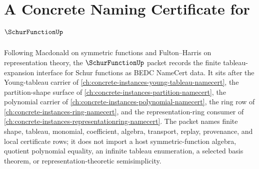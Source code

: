 \chapter{A Concrete Naming Certificate for $\SchurFunctionUp$}
\label{ch:concrete-instances-schur-function-namecert}

Following Macdonald on symmetric functions and Fulton--Harris on representation theory, the $\SchurFunctionUp$ packet records the finite tableau-expansion interface for Schur functions as BEDC NameCert data. It sits after the Young-tableau carrier of \autoref{ch:concrete-instances-young-tableau-namecert}, the partition-shape surface of \autoref{ch:concrete-instances-partition-namecert}, the polynomial carrier of \autoref{ch:concrete-instances-polynomial-namecert}, the ring row of \autoref{ch:concrete-instances-ring-namecert}, and the representation-ring consumer of \autoref{ch:concrete-instances-representationring-namecert}. The packet names finite shape, tableau, monomial, coefficient, algebra, transport, replay, provenance, and local certificate rows; it does not import a host symmetric-function algebra, quotient polynomial equality, an infinite tableau enumeration, a selected basis theorem, or representation-theoretic semisimplicity.

